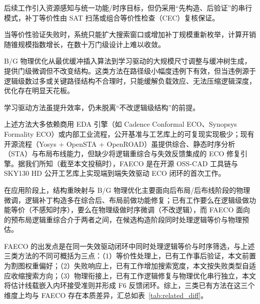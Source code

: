 \documentclass[journal]{IEEEtran}
\begin{document}
后续工作引入资源感知\cite{jiang2016resource}与统一功能/时序目标\cite{lin2011simult,luo2016unified}，但仍采用“先构造、后验证”的串行模式，补丁等价性由 SAT 扫荡或组合等价性检查（CEC）复核保证\cite{mishchenko2006sat,zhong2024stp}。

当等价性验证失败时，系统只能扩大搜索窗口或增加补丁规模重新枚举\cite{zhuo2018patch}，计算开销随锥规模指数增长，在数十万门级设计上难以收敛。

B/G 物理优化从最优缓冲插入算法\cite{liang2012buffer}到学习驱动的大规模尺寸调整与缓冲树生成\cite{liu2021rlsizer,huang2025phys,chen2024aito,zhang2025buffalo}，提供门级微调但不改变结构。这类方法在路径级小幅度违例下有效，但当违例源于逻辑级数过多或关键路径结构不合理时，只能缓解负载效应、无法压缩逻辑深度，优化存在明显天花板\cite{liu2021rlsizer,huang2025phys}。

学习驱动方法\cite{chen2024aito,zhang2025buffalo}虽提升效率，仍未脱离“不改逻辑级结构”的前提。

上述方法大多依赖商用 EDA 引擎（如 Cadence Conformal ECO、Synopsys Formality ECO）或内部工业流程，公开基准与工艺库上的可复现实现极少；现有开源流程（Yosys + OpenSTA + OpenROAD）虽提供综合、静态时序分析（STA）与布局布线能力，但缺少将逻辑重综合与失效反馈集成的 ECO 修复引擎。据我们所知（截至本文投稿时），FAECO 是在开源 OSS-CAD 工具链与 SKY130 HD 公开工艺库上实现端到端失效驱动 ECO 闭环的首次工作。

在应用阶段上，结构重映射与 B/G 物理优化主要面向后布局/后布线阶段的物理微调，逻辑补丁构造多在综合后、布局前做功能修复；已有工作要么在逻辑级做功能等价（不感知时序），要么在物理级做时序微调（不改逻辑），而 FAECO 面向的预布局逻辑重综合介于两者之间，在候选构造阶段同时处理逻辑等价与物理预估。

FAECO 的出发点是在同一失效驱动闭环中同时处理逻辑等价与时序筛选，与上述三类方法的不同可概括为三点：（1）等价性处理上，已有工作事后验证，本文前置为割图权重偏好；（2）失败响应上，已有工作增加搜索宽度，本文按失败类型自适应收缩搜索方向；（3）物理衔接上，已有工作逻辑修复与物理优化串行独立，本文将估计线载嵌入内环接受准则并形成 F6 反馈闭环。综上，三类已有方法在这三个维度上均与 FAECO 存在本质差异，汇总如表~\ref{tab:related_diff}。
\end{document}
